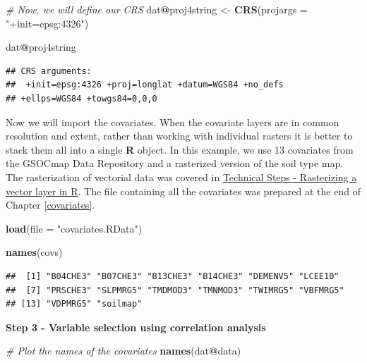 \documentclass[10pt,b5paper,]{book}
\newenvironment{Shaded}{\begin{snugshade}}{\end{snugshade}}
\newcommand{\CommentTok}[1]{\textcolor[rgb]{0.56,0.35,0.01}{\textit{#1}}}
\newcommand{\DataTypeTok}[1]{\textcolor[rgb]{0.13,0.29,0.53}{#1}}
\newcommand{\KeywordTok}[1]{\textcolor[rgb]{0.13,0.29,0.53}{\textbf{#1}}}
\newcommand{\NormalTok}[1]{#1}
\newcommand{\OperatorTok}[1]{\textcolor[rgb]{0.81,0.36,0.00}{\textbf{#1}}}
\newcommand{\StringTok}[1]{\textcolor[rgb]{0.31,0.60,0.02}{#1}}
\theoremstyle{definition}
\theoremstyle{definition}
\theoremstyle{definition}
\theoremstyle{remark}
\begin{document}
\begin{Shaded}
\begin{Highlighting}[]
\CommentTok{# Now, we will define our CRS}
\NormalTok{dat}\OperatorTok{@}\NormalTok{proj4string <-}\StringTok{ }\KeywordTok{CRS}\NormalTok{(}\DataTypeTok{projargs =} \StringTok{"+init=epsg:4326"}\NormalTok{)}

\NormalTok{dat}\OperatorTok{@}\NormalTok{proj4string}
\end{Highlighting}
\end{Shaded}

\begin{verbatim}
## CRS arguments:
##  +init=epsg:4326 +proj=longlat +datum=WGS84 +no_defs
## +ellps=WGS84 +towgs84=0,0,0
\end{verbatim}

Now we will import the covariates. When the covariate layers are in
common resolution and extent, rather than working with individual
rasters it is better to stack them all into a single \textbf{R} object.
In this example, we use 13 covariates from the GSOCmap Data Repository
and a rasterized version of the soil type map. The rasterization of
vectorial data was covered in
\protect\hyperlink{technical-steps---rasterizing-a-vector-layer-in-r}{Technical
Steps - Rasterizing a vector layer in R}. The file containing all the
covariates was prepared at the end of Chapter \ref{covariates}.

\begin{Shaded}
\begin{Highlighting}[]
\KeywordTok{load}\NormalTok{(}\DataTypeTok{file =} \StringTok{"covariates.RData"}\NormalTok{)}

\KeywordTok{names}\NormalTok{(covs)}
\end{Highlighting}
\end{Shaded}

\begin{verbatim}
##  [1] "B04CHE3" "B07CHE3" "B13CHE3" "B14CHE3" "DEMENV5" "LCEE10" 
##  [7] "PRSCHE3" "SLPMRG5" "TMDMOD3" "TMNMOD3" "TWIMRG5" "VBFMRG5"
## [13] "VDPMRG5" "soilmap"
\end{verbatim}

\textbf{Step 3 - Variable selection using correlation analysis}

\begin{Shaded}
\begin{Highlighting}[]
\CommentTok{# Plot the names of the covariates}
\KeywordTok{names}\NormalTok{(dat}\OperatorTok{@}\NormalTok{data)}
\end{Highlighting}
\end{Shaded}
\end{document}
